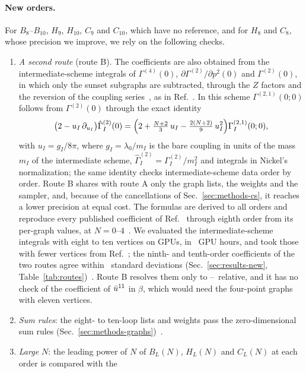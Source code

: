 \paragraph{New orders.}
For $B_8$--$B_{10}$, $H_9$, $H_{10}$, $C_9$ and $C_{10}$, which have no reference, and for $H_8$ and $C_8$, whose
precision we improve, we rely on the following checks.
\begin{enumerate}
\item \emph{A second route} (route B). The coefficients are also obtained from the intermediate-scheme
integrals of $\Gamma^{(4)}(0)$, $\partial\Gamma^{(2)}/\partial p^2(0)$ and $\Gamma^{(2)}(0)$, in which only the sunset
subgraphs are subtracted, through the $Z$ factors and the reversion of the coupling series~\cite{Ribeca2003thesis}, as in
Ref.~\cite{Phi4tools2024}. In this scheme $\Gamma^{(2,1)}(0;0)$ follows from $\Gamma^{(2)}(0)$ through the exact
identity~\cite{Ribeca2003thesis}
\begin{equation}
\bigl(2-u_I\,\partial_{u_I}\bigr)\hat\Gamma^{(2)}_I(0)
=\Bigl(2+\tfrac{N+2}{3}\,u_I-\tfrac{2(N+2)}{9}\,u_I^2\Bigr)\Gamma^{(2,1)}_I(0;0),
\label{eq:intermediate}
\end{equation}
with $u_I=g_I/8\pi$, where $g_I=\lambda_0/m_I$ is the bare coupling in units of the mass $m_I$ of the intermediate
scheme, $\hat\Gamma^{(2)}_I=\Gamma^{(2)}_I/m_I^2$ and integrals in Nickel's normalization; the same identity
checks intermediate-scheme data order by order. Route B shares with route A only the graph lists, the weights and the sampler, and,
because of the cancellations of Sec.~\ref{sec:methods-cs}, it reaches a lower precision at equal cost.
The formulas are derived to all orders and reproduce every published coefficient of Ref.~\cite{Phi4tools2024}
through eighth order from its per-graph values, at $N=0$--$4$~. We evaluated the intermediate-scheme
integrals with eight to ten vertices on GPUs, in \routeBhours\ GPU hours, and took those with fewer vertices from
Ref.~\cite{Phi4tools2024}; the ninth- and tenth-order coefficients of the two routes agree within \routeBzmax\
standard deviations (Sec.~\ref{sec:results-new}, Table~\ref{tab:routes})~. Route B resolves them only to
\routeBrelmin--\routeBrelmax\ relative, and it has no check of the coefficient of $\bar u^{11}$ in $\beta$, which would
need the four-point graphs with eleven vertices.
\item \emph{Sum rules}: the eight- to ten-loop lists and weights pass the zero-dimensional sum rules
(Sec.~\ref{sec:methods-graphs})~\check{G2}.
\item \emph{Large $N$}: the leading power of $N$ of $B_L(N)$, $H_L(N)$ and $C_L(N)$ at each order is compared with the

\end{enumerate}
